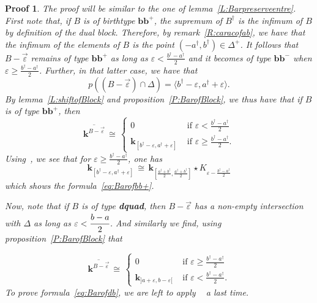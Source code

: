 \documentclass[a4paper, english, 11pt]{article}
\newcommand{\kk}[0]{\textbf{k}}
\newcommand{\0}{\vec{0}}
\newtheorem*{pf}{Proof} }
\begin{document}
\begin{pf}The proof will be similar to the one of lemma~\ref{L:Barpreserveentre}. First note that,  if $B$ is of birthtype $\textbf{bb}^+$, the supremum of $B^\dagger$ is the infimum of $B$ by definition of the dual block. Therefore, by remark~\ref{R:caracofab}, we have that the infimum of the elements of $B$ is the point $(-a^\dagger, b^\dagger)\in \Delta^+$. 
It follows that $B-\vec{\varepsilon}$ remains of type $\textbf{bb}^+$ as long as $\varepsilon < \frac{b^\dagger-a^\dagger}{2}$ and it becomes of type $\textbf{bb}^{-}$ when  $\varepsilon \geqslant \frac{b^\dagger-a^\dagger}{2}$. Further, in that latter case, we have that 
$$ p((B-\vec{\varepsilon})\cap \Delta) = \langle b^\dagger  -\varepsilon,  a^\dagger + \varepsilon \rangle.  $$
By lemma~\ref{L:shiftofBlock} and proposition~\ref{P:BarofBlock}, we thus have that {if $B$ is of type $\textbf{bb}^{+}$, then }
 \[
   \overline{\kk^{B-\vec{\varepsilon}}} 
 \, \cong \, \left\{ \begin{array}{ll}  0 & \mbox{ if $\varepsilon< \frac{b^\dagger-a^\dagger}{2}$}\\
 \kk_{[b^\dagger  -\varepsilon,  a^\dagger + \varepsilon]}& \mbox{ if $\varepsilon \geqslant \frac{b^\dagger-a^\dagger}{2}$.} \end{array}                                                                                                                          \right . \]
 Using~\cite[Proposition 3.8]{Berk18}, we see that for  $\varepsilon \geqslant \frac{b^\dagger-a^\dagger}{2}$, one has $$\kk_{[b^\dagger  -\varepsilon,  a^\dagger + \varepsilon]} 
 \, \cong \,\kk_{[\frac{a^\dagger+b^\dagger}{2}, \frac{a^\dagger+b^\dagger}{2}]}\star K_{\varepsilon -\frac{b^\dagger -a^\dagger}{2}} $$
 which shows the formula~\eqref{eq:Barofbb+}. 
 
 Now, note that if $B$ is of type \textbf{dquad}, then $B-\vec{\varepsilon}$ has a non-empty intersection with $\Delta$ as long as $\varepsilon < \cfrac{b-a}{2}$. And similarly we find, using proposition~\ref{P:BarofBlock} that 
 
 \[
  \overline{\kk^{B-\vec{\varepsilon}}} 
 \, \cong \,\left\{ \begin{array}{ll}  0 & \mbox{ if $\varepsilon \geq \frac{b^\dagger-a^\dagger}{2}$} \\  \kk_{]a+\varepsilon, b-\varepsilon [}  & \mbox{ if $\varepsilon < \frac{b^\dagger-a^\dagger}{2}$}.\end{array}                                                                                                                          \right . \]
 To prove formula~\eqref{eq:Barofdb}, we are left to apply ~\cite[Proposition 3.8]{Berk18} a last time.
\end{pf}
\end{document}
